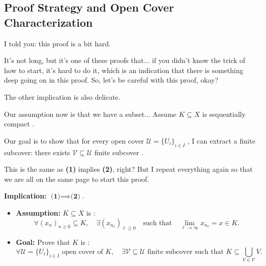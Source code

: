 \begin{proofWrapper}

\subsection{Proof Strategy and Open Cover Characterization}

\begin{speech}[01:06:06 - 01:07:41]
I told you: this proof is a bit hard.

It's not long, but it's one of these proofs that... if you didn't know the trick of how to start, it's hard to do it, which is an indication that there is something deep going on in this proof. So, let's be careful with this proof, okay?

The other implication is also delicate.

Our assumption now is that we have a subset... Assume $K \subseteq X$ is sequentially compact .

Our goal is to show  that for every open cover $\mathcal{U} = \{ U_i \}_{i \in I}$ , I can extract a finite subcover: there exists $\mathcal{V} \subseteq \mathcal{U}$ finite subcover .

This is the same as \textbf{(1)} implies \textbf{(2)}, right? But I repeat everything again so that we are all on the same page to start this proof.
\end{speech}

\begin{content}
\textbf{Implication:} $\textbf{(1)} \implies \textbf{(2)}$.

\begin{itemize}
    \item \textbf{Assumption:} $K \subseteq X$ is :
    \[
    \forall (x_n)_{n \ge 0} \subseteq K, \quad \exists (x_{n_\ell})_{\ell \ge 0} \quad \text{such that} \quad \lim_{\ell \to \infty} x_{n_\ell} = x \in K.
    \]
    \item \textbf{Goal:} Prove that $K$ is :
    \[
    \forall \mathcal{U} = \{ U_i \}_{i \in I} \text{ open cover of } K, \quad \exists \mathcal{V} \subseteq \mathcal{U} \text{ finite subcover such that } K \subseteq \bigcup_{V \in \mathcal{V}} V.
    \]
\end{itemize}
\end{content}


\end{proofWrapper}
